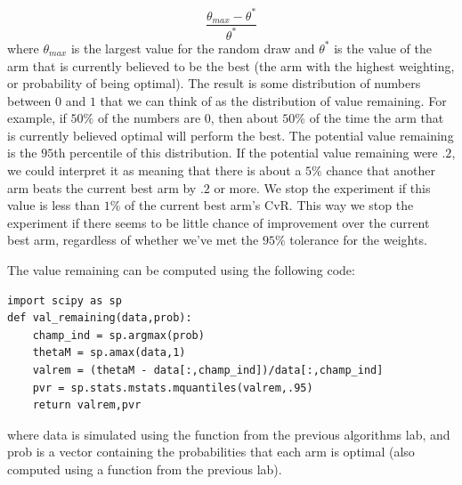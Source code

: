 \begin{equation}\label{valrem}
\frac{\theta_{max} - \theta^*}{\theta^*}
\end{equation}
where $\theta_{max}$ is the largest value for the random draw and $\theta^*$ is the value of the arm that is currently believed to be the best (the arm with the highest weighting, or probability of being optimal).  The result is some distribution of numbers between $0$ and $1$ that we can think of as the distribution of value remaining.  For example, if $50\%$ of the numbers are 0, then about $50\%$ of the time the arm that is currently believed optimal will perform the best.  The potential value remaining is the $95$th percentile of this distribution.  If the potential value remaining were $.2$, we could interpret it as meaning that there is about a $5\%$ chance that another arm beats the current best arm by $.2$ or more.  We stop the experiment if this value is less than $1\%$ of the current best arm's CvR.  This way we stop the experiment if there seems to be little chance of improvement over the current best arm, regardless of whether we've met the $95\%$ tolerance for the weights.

The value remaining can be computed using the following code:

\begin{lstlisting}
import scipy as sp
def val_remaining(data,prob):
    champ_ind = sp.argmax(prob)
    thetaM = sp.amax(data,1)
    valrem = (thetaM - data[:,champ_ind])/data[:,champ_ind]
    pvr = sp.stats.mstats.mquantiles(valrem,.95)
    return valrem,pvr
\end{lstlisting}
where data is simulated using the  function from the previous algorithms lab, and prob is a vector containing the probabilities that each arm is optimal (also computed using a function from the previous lab).

